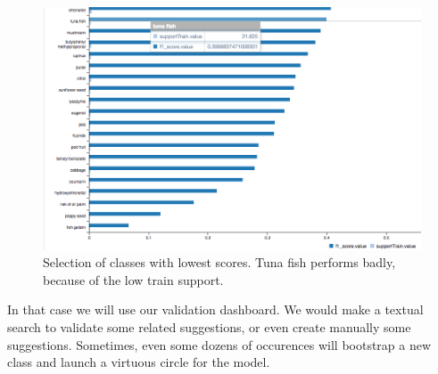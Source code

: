 \begin{figure}[H]
\centering
\includegraphics[scale=0.5]{./images/data-quality/islabeledby_support_score.png}
\caption{Selection of classes with lowest scores. Tuna fish performs badly, because of the low train support.}
\end{figure}

In that case we will use our validation dashboard. We would make a textual search to validate some related suggestions, or even create manually some suggestions. Sometimes, even some dozens of occurences will bootstrap a new class and launch a virtuous circle for the model.



